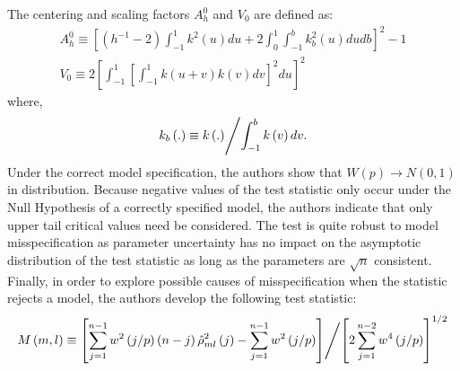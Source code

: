The centering and scaling factors $A_h^0$ and $V_0$ are defined as:
\begin{equation}\label{eq:HL6}
\begin{array}{l}
A_h^0 \equiv {\left[ {\left( {{h^{ - 1}} - 2} \right)\int_{ - 1}^1 {{k^2}\left( u \right)du + 2\int_0^1 {\int_{ - 1}^b {k_b^2\left( u \right)dudb} } } } \right]^2} - 1\\
{V_0} \equiv 2{\left[ {\int_{ - 1}^1 {{{\left[ {\int_{ - 1}^1 {k\left( {u + v} \right)k\left( v \right)dv} } \right]}^2}du} } \right]^2}
\end{array}
\end{equation}
where,
\begin{equation}\label{eq:HL7}
{k_b}\left( . \right) \equiv {{k\left( . \right)} \mathord{\left/{\vphantom {{k\left( . \right)} {\int_{ - 1}^b {k\left( v \right)dv} }}} \right.\kern-\nulldelimiterspace} {\int_{ - 1}^b {k\left( v \right)dv} }}.
\end{equation}
Under the correct model specification, the authors show that
$\hat W\left( p \right)\rightarrow N\left(0,1\right)$ in distribution. Because
negative values of the test statistic only occur under the Null Hypothesis of a
correctly specified model, the authors indicate that only upper tail critical values
need be considered. The test is quite robust to model misspecification as parameter
uncertainty has no impact on the asymptotic distribution of the test statistic as
long as the parameters are $\sqrt n$ consistent. Finally, in order to explore possible
causes of misspecification when the statistic rejects a model, the authors develop
the following test statistic:
\begin{equation}\label{eq:HL8}
M\left( {m,l} \right) \equiv {{\left[ {\sum\limits_{j = 1}^{n - 1} {{w^2}\left( {{j \mathord{\left/
 {\vphantom {j p}} \right.
 \kern-\nulldelimiterspace} p}} \right)\left( {n - j} \right)\hat \rho _{ml}^2\left( j \right) - \sum\limits_{j = 1}^{n - 1} {{w^2}\left( {{j \mathord{\left/
 {\vphantom {j p}} \right.
 \kern-\nulldelimiterspace} p}} \right)} } } \right]} \mathord{\left/
 {\vphantom {{\left[ {\sum\limits_{j = 1}^{n - 1} {{w^2}\left( {{j \mathord{\left/
 {\vphantom {j p}} \right.
 \kern-\nulldelimiterspace} p}} \right)\left( {n - j} \right)\hat \rho _{ml}^2\left( j \right) - \sum\limits_{j = 1}^{n - 1} {{w^2}\left( {{j \mathord{\left/
 {\vphantom {j p}} \right.
 \kern-\nulldelimiterspace} p}} \right)} } } \right]} {{{\left[ {2\sum\limits_{j = 1}^{n - 2} {{w^4}\left( {{j \mathord{\left/
 {\vphantom {j p}} \right.
 \kern-\nulldelimiterspace} p}} \right)} } \right]}^{1/2}}}}} \right.
 \kern-\nulldelimiterspace} {{{\left[ {2\sum\limits_{j = 1}^{n - 2} {{w^4}\left( {{j \mathord{\left/
 {\vphantom {j p}} \right.
 \kern-\nulldelimiterspace} p}} \right)} } \right]}^{1/2}}}}
\end{equation}

